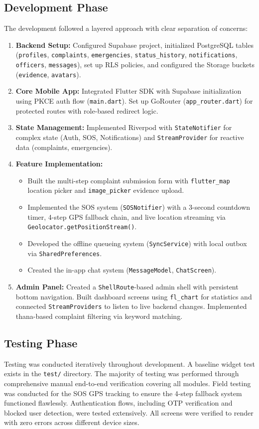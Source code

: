 \documentclass[12pt, a4paper, twoside]{report}
\begin{document}
\subsection{Development Phase}
The development followed a layered approach with clear separation of concerns:
\begin{enumerate}
    \item \textbf{Backend Setup:} Configured Supabase project, initialized PostgreSQL tables (\texttt{profiles}, \texttt{complaints}, \texttt{emergencies}, \texttt{status\_history}, \texttt{notifications}, \texttt{officers}, \texttt{messages}), set up RLS policies, and configured the Storage buckets (\texttt{evidence}, \texttt{avatars}).
    \item \textbf{Core Mobile App:} Integrated Flutter SDK with Supabase initialization using PKCE auth flow (\texttt{main.dart}). Set up GoRouter (\texttt{app\_router.dart}) for protected routes with role-based redirect logic.
    \item \textbf{State Management:} Implemented Riverpod with \texttt{StateNotifier} for complex state (Auth, SOS, Notifications) and \texttt{StreamProvider} for reactive data (complaints, emergencies).
    \item \textbf{Feature Implementation:}
    \begin{itemize}
        \item Built the multi-step complaint submission form with \texttt{flutter\_map} location picker and \texttt{image\_picker} evidence upload.
        \item Implemented the SOS system (\texttt{SOSNotifier}) with a 3-second countdown timer, 4-step GPS fallback chain, and live location streaming via \texttt{Geolocator.getPositionStream()}.
        \item Developed the offline queueing system (\texttt{SyncService}) with local outbox via \texttt{SharedPreferences}.
        \item Created the in-app chat system (\texttt{MessageModel}, \texttt{ChatScreen}).
    \end{itemize}
    \item \textbf{Admin Panel:} Created a \texttt{ShellRoute}-based admin shell with persistent bottom navigation. Built dashboard screens using \texttt{fl\_chart} for statistics and connected \texttt{StreamProviders} to listen to live backend changes. Implemented thana-based complaint filtering via keyword matching.
\end{enumerate}

\subsection{Testing Phase}
Testing was conducted iteratively throughout development. A baseline widget test exists in the \texttt{test/} directory. The majority of testing was performed through comprehensive manual end-to-end verification covering all modules. Field testing was conducted for the SOS GPS tracking to ensure the 4-step fallback system functioned flawlessly. Authentication flows, including OTP verification and blocked user detection, were tested extensively. All screens were verified to render with zero errors across different device sizes.
\end{document}
